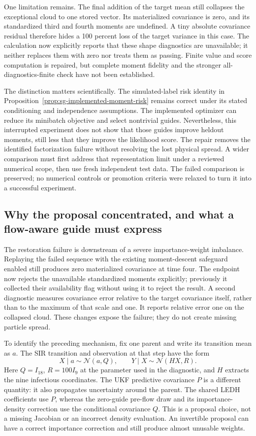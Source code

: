 One limitation remains. The final addition of the target mean still collapses
the exceptional cloud to one stored vector. Its materialized covariance is
zero, and its standardized third and fourth moments are undefined. A tiny
absolute covariance residual therefore hides a 100 percent loss of the
target variance in this case. The calculation now explicitly reports that
these shape diagnostics are unavailable; it neither replaces them with zero
nor treats them as passing. Finite value and score computation is repaired,
but complete moment fidelity and the stronger all-diagnostics-finite check
have not been established.

The distinction matters scientifically. The simulated-label risk identity in
Proposition~\ref{prop:sg-implemented-moment-risk} remains correct under its
stated conditioning and independence assumptions. The implemented optimizer
can reduce its minibatch objective and select nontrivial guides. Nevertheless,
this interrupted experiment does not show that those guides improve heldout
moments, still less that they improve the likelihood score. The repair removes
the identified factorization failure without resolving the lost physical
spread. A wider comparison must first address that representation limit
under a reviewed numerical scope, then use fresh independent test data.
The failed comparison is preserved; no numerical controls or promotion
criteria were relaxed to turn it into a successful experiment.

\subsection{Why the proposal concentrated, and what a flow-aware guide must express}
\label{sec:sg-proposal-collapse}

The restoration failure is downstream of a severe importance-weight
imbalance. Replaying the failed sequence with the existing moment-descent
safeguard enabled still produces zero materialized covariance at time four.
The endpoint now rejects the unavailable standardized moments explicitly;
previously it collected their availability flag without using it to reject
the result. A second diagnostic measures covariance error relative to the
target covariance itself, rather than to the maximum of that scale and one.
It reports relative error one on the collapsed cloud. These changes expose
the failure; they do not create missing particle spread.

To identify the preceding mechanism, fix one parent and write its transition
mean as $a$. The SIR transition and observation at that step have the form
\[
 X\mid a\sim\mathcal N(a,Q),\qquad Y\mid X\sim\mathcal N(HX,R).
\]
Here $Q=I_{18}$, $R=100I_9$ at the parameter used in the diagnostic, and $H$
extracts the nine infectious coordinates. The UKF predictive covariance $P$
is a different quantity: it also propagates uncertainty around the parent.
The shared LEDH coefficients use $P$, whereas the zero-guide pre-flow draw
and its importance-density correction use the conditional covariance $Q$.
This is a proposal choice, not a missing Jacobian or an incorrect density
evaluation. An invertible proposal can have a correct importance correction
and still produce almost unusable weights.

